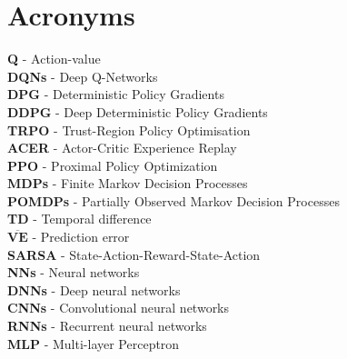 \chapter{Acronyms}
\label{app:acronyms}

\textbf{Q} - Action-value \\[-4mm]

\noindent
\textbf{DQNs} - Deep Q-Networks \\[-4mm]

\noindent
\textbf{DPG} - Deterministic Policy Gradients \\[-4mm]

\noindent
\textbf{DDPG} - Deep Deterministic Policy Gradients \\[-4mm]

\noindent
\textbf{TRPO} - Trust-Region Policy Optimisation \\[-4mm]

\noindent
\textbf{ACER} - Actor-Critic Experience Replay \\[-4mm]

\noindent
\textbf{PPO} - Proximal Policy Optimization \\[-4mm]

\noindent
\textbf{MDPs} - Finite Markov Decision Processes \\[-4mm]

\noindent
\textbf{POMDPs} - Partially Observed Markov Decision Processes \\[-4mm]

\noindent
\textbf{TD} - Temporal difference \\[-4mm]

\noindent
$\boldsymbol{\overline{VE}}$ - Prediction error \\[-4mm]

\noindent
\textbf{SARSA} - State-Action-Reward-State-Action \\[-4mm]

\noindent
\textbf{NNs} - Neural networks \\[-4mm]

\noindent
\textbf{DNNs} - Deep neural networks \\[-4mm]

\noindent
\textbf{CNNs} - Convolutional neural networks \\[-4mm]

\noindent
\textbf{RNNs} - Recurrent neural networks \\[-4mm]

\noindent
\textbf{MLP} - Multi-layer Perceptron \\[-4mm]


